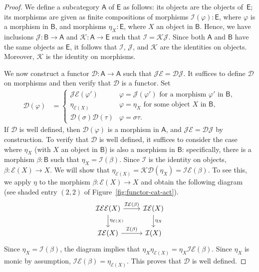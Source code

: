 \documentclass{amsart}
\newcommand{\Cat}[1]{\mathsf{#1}}
\newcommand{\cat}[1]{\Cat{#1}}
\newcommand{\acat}[1]{\mathsf{#1}}
\numberwithin{lstfloat}{section}
\newcommand{\func}[1]{\mathcal{#1}}
\newcommand{\fD}{\func{D}}
\newcommand{\fE}{\func{E}}
\newcommand{\fI}{\func{I}}
\newcommand{\fJ}{\func{J}}
\newcommand{\fK}{\func{K}}
\theoremstyle{definition}
\theoremstyle{remark}
\numberwithin{equation}{section}
\begin{document}
 
\begin{proof}
  We define a subcategory $\cat{A}$ of $\cat{E}$ as follows: its objects are the
  objects of~$\acat{E}$; its morphisms are given as finite compositions of
  morphisms $\func{I}(\varphi):\acat{E}$, where $\varphi$ is a morphism in
  $\acat{B}$, and morphisms $\eta_X:\acat{E}$, where $X$ an object in
  $\acat{B}$. Hence, we have inclusions $\func{J} : \cat{B} \to \cat{A}$ and
  $\func{K} : \cat{A} \to \cat{E}$ such that $\func{I} = \func{KJ}$. Since both
  $\acat{A}$ and $\acat{B}$ have the same objects as $\acat{E}$, it follows that
  $\func{I}$, $\func{J}$, and $\func{K}$ are the identities on objects. Moreover, $\func{K}$ is the identity on morphisms.

  We now construct a functor $\fD:\cat{A}\to \cat{A}$ such that $\func{J}
  \func{E}= \fD \func{J}$. It suffices to define $\fD$ on morphisms and then
  verify that $\fD$ is a functor. Set
  \begin{align*} 
    \fD (\varphi) & = \begin{cases}
      \func{JE}(\varphi') & \varphi = \fJ(\varphi')\text{ for a morphism $\varphi'$ in } \cat{B}, \\
      \eta_{\func{E}(X)} & \varphi=\eta_X\text{ for some object $X$ in $\acat{B}$}, \\
      \func{D}(\sigma)\func{D}(\tau) & \varphi=\sigma\tau.
    \end{cases}
  \end{align*}
  If $\fD$ is well defined, then $\func{D}(\varphi)$ is a morphism in
  $\acat{A}$, and $\func{J} \func{E}=\fD \func{J}$ by construction. To verify
  that $\fD$ is well defined, it suffices to consider the case where  $\eta_X$
  (with $X$ an object in $\acat{B}$) is also a morphism in $\acat{B}$:
  specifically, there is a morphism $\beta :\acat{B}$ such that $\eta_X =
  \func{I}(\beta)$. Since $\fI$ is the identity on objects, $\beta : \fE(X) \to
  X$. We will show that $\eta_{\func{E}(X)}=\fK\fD(\eta_X)=\func{IE}(\beta)$. To
  see this, we apply $\eta$ to the morphism $\beta:\func{E}(X)\to X$ and obtain
  the following diagram (see shaded entry $(2,2)$ of
  Figure~\ref{fig:functor-cat-act}).
  \[ 
    \begin{tikzcd}
      \func{I}\func{E}\func{E}(X) \arrow[r, "\func{IE}(\beta)"] \arrow[d, "\eta_{\fE(X)}"] 
        & \func{I}\func{E}(X) \arrow[d, "\eta_{X}"] \\
      \func{I}\func{E}(X) \arrow[r, "\func{I}(\beta)"] & \func{I}(X)
    \end{tikzcd}
  \]
  Since $\eta_X = \fI(\beta)$, the diagram implies that $\eta_X
  \eta_{\func{E}(X)}=\eta_X \func{IE}(\beta)$. Since $\eta_X$ is monic by
  assumption,  $\func{IE}(\beta)=\eta_{\func{E}(X)}$. This proves that
  $\func{D}$ is well defined. 


\end{proof}
\end{document}
